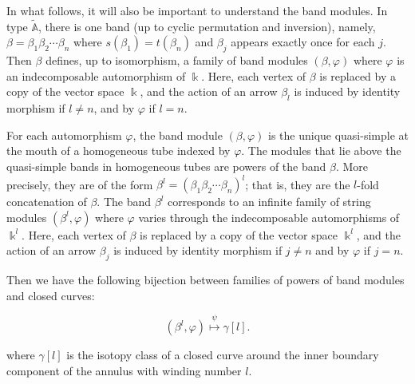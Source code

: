 \documentclass[12pt]{amsart}
\theoremstyle{plain}
\theoremstyle{definition}
\theoremstyle{remark}
\begin{document}
{\color{black}
In what follows, it will also be important to understand the band modules. In type $\tilde{\mathbb{A}}$, there is one band (up to cyclic permutation and inversion), namely, $\beta = \beta_1 \beta_{2} \cdots \beta_{n}$ where $s(\beta_1) = t(\beta_{n})$ and $\beta_j$ appears exactly once for each $j$. Then $\beta$ defines, up to isomorphism, a family of band modules $(\beta,\varphi)$ where $\varphi$ is an indecomposable automorphism of $\Bbbk$. Here, each vertex of $\beta$ is replaced by a copy of the vector space $\Bbbk$, and the action of an arrow $\beta_l$ is induced by identity morphism if $l \neq n$, and by $\varphi$ if $l = n$. 

For each automorphism $\varphi$, the band module $(\beta,\varphi)$ is the unique quasi-simple at the mouth of a homogeneous tube indexed by $\varphi$. The modules that lie above the quasi-simple bands in homogeneous tubes are powers of the band $\beta$. More precisely, they are of the form $\beta^l = (\beta_1\beta_2\cdots\beta_n)^l$;
that is, they are the $l$-fold concatenation of $\beta$. The band $\beta^l$ corresponds to an infinite family of string modules $(\beta^l,\varphi)$ where $\varphi$ varies through the indecomposable automorphisms of $\Bbbk^l$. Here, each vertex of $\beta$ is replaced by a copy of the vector space $\Bbbk^l$, and the action of an arrow $\beta_j$ is induced by identity morphism if $j \neq n$ and by $\varphi$ if $j = n$.

Then we have the following bijection between families of powers of band modules and closed curves:

\[ (\beta^l,\varphi) \overset{\psi}{\mapsto} \gamma[l]. \]

where $\gamma[l]$ is the isotopy class of a closed curve around the inner boundary component of the annulus with winding number $l$.  }
\end{document}
